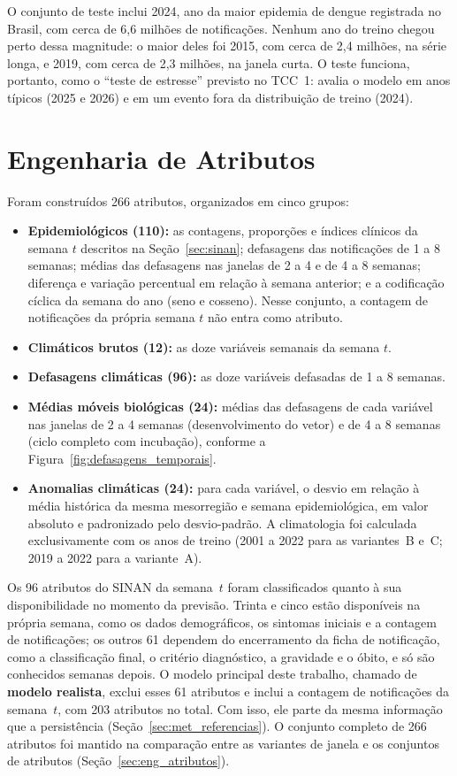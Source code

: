 O conjunto de teste inclui 2024, ano da maior epidemia de dengue registrada no Brasil, com cerca de 6,6 milhões de notificações. Nenhum ano do treino chegou perto dessa magnitude: o maior deles foi 2015, com cerca de 2,4 milhões, na série longa, e 2019, com cerca de 2,3 milhões, na janela curta. O teste funciona, portanto, como o ``teste de estresse'' previsto no TCC~1: avalia o modelo em anos típicos (2025 e 2026) e em um evento fora da distribuição de treino (2024).

\section{Engenharia de Atributos}
\label{sec:atributos}

Foram construídos 266 atributos, organizados em cinco grupos:

\begin{itemize}
    \item \textbf{Epidemiológicos (110):} as contagens, proporções e índices clínicos da semana $t$ descritos na Seção~\ref{sec:sinan}; defasagens das notificações de 1 a 8 semanas; médias das defasagens nas janelas de 2 a 4 e de 4 a 8 semanas; diferença e variação percentual em relação à semana anterior; e a codificação cíclica da semana do ano (seno e cosseno). Nesse conjunto, a contagem de notificações da própria semana $t$ não entra como atributo.
    \item \textbf{Climáticos brutos (12):} as doze variáveis semanais da semana $t$.
    \item \textbf{Defasagens climáticas (96):} as doze variáveis defasadas de 1 a 8 semanas.
    \item \textbf{Médias móveis biológicas (24):} médias das defasagens de cada variável nas janelas de 2 a 4 semanas (desenvolvimento do vetor) e de 4 a 8 semanas (ciclo completo com incubação), conforme a Figura~\ref{fig:defasagens_temporais}.
    \item \textbf{Anomalias climáticas (24):} para cada variável, o desvio em relação à média histórica da mesma mesorregião e semana epidemiológica, em valor absoluto e padronizado pelo desvio-padrão. A climatologia foi calculada exclusivamente com os anos de treino (2001 a 2022 para as variantes~B e~C; 2019 a 2022 para a variante~A).
\end{itemize}

Os 96 atributos do SINAN da semana~$t$ foram classificados quanto à sua disponibilidade no momento da previsão. Trinta e cinco estão disponíveis na própria semana, como os dados demográficos, os sintomas iniciais e a contagem de notificações; os outros 61 dependem do encerramento da ficha de notificação, como a classificação final, o critério diagnóstico, a gravidade e o óbito, e só são conhecidos semanas depois. O modelo principal deste trabalho, chamado de \textbf{modelo realista}, exclui esses 61 atributos e inclui a contagem de notificações da semana~$t$, com 203 atributos no total. Com isso, ele parte da mesma informação que a persistência (Seção~\ref{sec:met_referencias}). O conjunto completo de 266 atributos foi mantido na comparação entre as variantes de janela e os conjuntos de atributos (Seção~\ref{sec:eng_atributos}).


